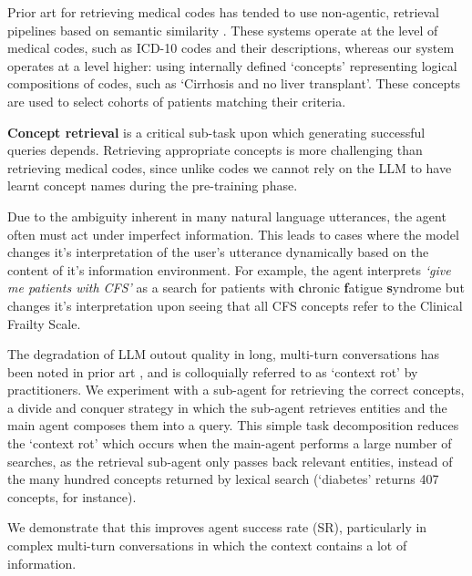 \documentclass[11pt]{article}
\begin{document}
Prior art for retrieving medical codes has tended to use non-agentic, retrieval pipelines based on semantic similarity \citet{baksi_medcoder_2024, ziletti_retrieval_2024}.
These systems operate at the level of medical codes, such as ICD-10 codes and their descriptions, whereas our system operates at a level higher: using internally defined `concepts' representing logical compositions of codes, such as `Cirrhosis and no liver transplant'.
These concepts are used to select cohorts of patients matching their criteria.

\textbf{Concept retrieval} is a critical sub-task upon which generating successful queries depends.
Retrieving appropriate concepts is more challenging than retrieving medical codes, since unlike codes we cannot rely on the LLM to have learnt concept names during the pre-training phase.

Due to the ambiguity inherent in many natural language utterances, the agent often must act under imperfect information.
This leads to cases where the model changes it's interpretation of the user's utterance dynamically based on the content of it's information environment.
For example, the agent interprets \textit{`give me patients with CFS'} as a search for patients with \textbf{c}hronic \textbf{f}atigue \textbf{s}yndrome but changes it's interpretation upon seeing that all CFS concepts refer to the Clinical Frailty Scale. 


The degradation of LLM outout quality in long, multi-turn conversations has been noted in prior art \cite{laban_llms_2025}, and is colloquially referred to as `context rot' by practitioners.
We experiment with a sub-agent for retrieving the correct concepts, a divide and conquer strategy in which the sub-agent retrieves entities and the main agent composes them into a query.
This simple task decomposition reduces the `context rot' which occurs when the main-agent performs a large number of searches, as the retrieval sub-agent only passes back relevant entities, instead of the many hundred concepts returned by lexical search (`diabetes' returns 407 concepts, for instance).

We demonstrate that this improves agent success rate (SR), particularly in complex multi-turn conversations in which the context contains a lot of information.
\end{document}
